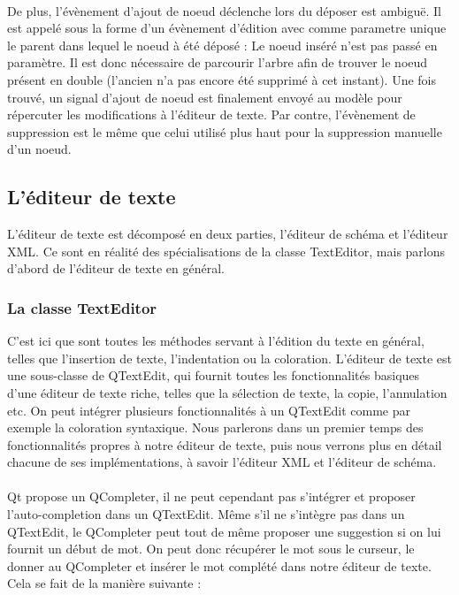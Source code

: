 \paragraph{}
De plus, l'évènement d'ajout de noeud déclenche lors du déposer est ambiguë. Il est appelé sous la forme d'un évènement d'édition avec comme parametre unique le parent dans lequel le noeud à été déposé : Le noeud inséré n'est pas passé en paramètre.
Il est donc nécessaire de parcourir l'arbre afin de trouver le noeud présent en double (l'ancien n'a pas encore été supprimé à cet instant). Une fois trouvé, un signal d'ajout de noeud est finalement envoyé au modèle pour répercuter les modifications à l'éditeur de texte.
Par contre, l'évènement de suppression est le même que celui utilisé plus haut pour la suppression manuelle d'un noeud.


\subsection{L'éditeur de texte}

L'éditeur de texte est décomposé en deux parties, l'éditeur de schéma et l'éditeur XML. Ce sont en réalité des spécialisations de la classe TextEditor, mais parlons d'abord de l'éditeur de texte en général.
\subsubsection{La classe TextEditor}
C'est ici que sont toutes les méthodes servant à l'édition du texte en général, telles que l'insertion de texte, l'indentation ou la coloration. L'éditeur de texte est une sous-classe de QTextEdit, qui fournit toutes les fonctionnalités basiques d'une éditeur de texte riche, telles que la sélection de texte, la copie, l'annulation etc. On peut intégrer plusieurs fonctionnalités à un QTextEdit comme par exemple la coloration syntaxique. Nous parlerons dans un premier temps des fonctionnalités propres à notre éditeur de texte, puis nous verrons plus en détail chacune de ses implémentations, à savoir l'éditeur XML et l'éditeur de schéma.

\paragraph{}
Qt propose un QCompleter, il ne peut cependant pas s'intégrer et proposer l'auto-completion dans un QTextEdit. Même s'il ne s'intègre pas dans un QTextEdit, le QCompleter peut tout de même proposer une suggestion si on lui fournit un début de mot. On peut donc récupérer le mot sous le curseur, le donner au QCompleter et insérer le mot complété dans notre éditeur de texte. Cela se fait de la manière suivante :

